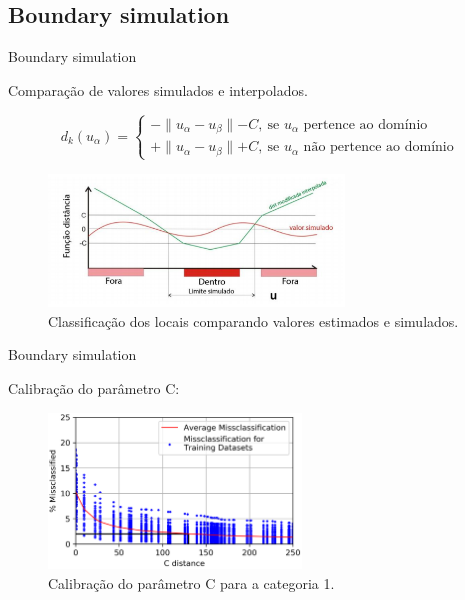 \documentclass[aspectratio=169]{beamer}
\begin{document}
\subsection{Boundary simulation}

\begin{frame}{Boundary simulation}

Comparação de valores simulados e interpolados.

	\begin{equation}
	d_k(u_\alpha)=\begin{cases}
	-\parallel u_\alpha-u_\beta\parallel - C,\:\textrm{se $u_\alpha$ pertence ao domínio}\\
	+\parallel u_\alpha-u_\beta\parallel + C,\:\textrm{se $u_\alpha$ não pertence ao domínio}\end{cases}
	\label{C_dist}
	\end{equation}
	
	\begin{figure}[H]
		\caption{\label{class}Classificação dos locais comparando valores estimados e simulados.}
		\begin{center}
			\includegraphics[width=0.7\textwidth]{capitulo_2/classificacao.png}
		\end{center}
	\end{figure}
\end{frame}

\begin{frame}{Boundary simulation}

Calibração do parâmetro C:

	\begin{figure}[H]
		\caption{\label{c_param_1}Calibração do parâmetro C para a categoria 1.}
		\begin{center}
			\includegraphics[width=0.6\textwidth]{capitulo_2/uncert_1.png}
		\end{center}
	\end{figure}
\end{frame}
\end{document}
